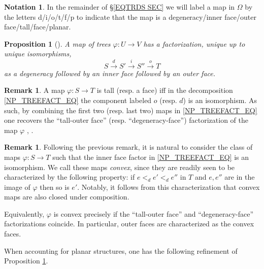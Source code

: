 \documentclass[a4paper,10pt
,draft
]{article}%
\numberwithin{equation}{section}
\numberwithin{figure}{section}
\newtheorem{proposition}[equation]{Proposition}%
\theoremstyle{definition} %
\newtheorem{remark}[equation]{Remark}%
\newtheorem{notation}[equation]{Notation}%
\newcommand{\1}{\ensuremath{\mathbbm 1}}%
\begin{document}
\begin{notation}\label{MAPLABELS_NOT}
	In the remainder of \S \ref{EQTRDS SEC}
      we will label a 
      map in $\Omega$
      by the letters d/i/o/t/f/p
      to indicate that the map is
      a degeneracy/inner face/outer face/tall/face/planar.
\end{notation}


\begin{proposition}[{\cite[Prop. 2.2]{BP_edss}}]
      \label{NP_TREEFACT_PROP}
	A map of trees $\varphi \colon U \to V$ has a factorization, unique up to unique isomorphisms,
        \begin{equation}\label{NP_TREEFACT_EQ}
              S \xrightarrow{d} 
              S' \xrightarrow{i} 
              S'' \xrightarrow{o}
              T
        \end{equation}
        as a degeneracy followed by an inner face followed by an outer face.
\end{proposition}

\begin{remark}\label{TODF REM}
	A map $\varphi \colon S \to T$
	is tall (resp. a face)
	iff in the decomposition \eqref{NP_TREEFACT_EQ}
	the component labeled $o$ (resp. $d$)
	is an isomorphism.
	As such, by combining the 
	first two (resp. last two)
	maps in \eqref{NP_TREEFACT_EQ}
	one recovers the 
	``tall-outer face'' 
	(resp. ``degeneracy-face'')
	factorization of the map $\varphi$
	\cite[Prop. 3.36]{BP_geo}, \cite[Prop. 5.37]{Per18}.
\end{remark}



\begin{remark}\label{CNVXM REM}
	Following the previous remark, 
	it is natural to consider the class of maps
	$\varphi \colon S \to T$
	such that the inner face factor
	in \eqref{NP_TREEFACT_EQ} is an isomorphism.
	We call these maps \textit{convex},
	since they are readily seen to be 
	characterized by the following property:
	if $e <_d e' <_d e''$ in $T$ 
	and $e,e''$ are in the image of $\varphi$
	then so is $e'$.
	Notably, it follows from this characterization that convex maps are also closed under composition.
	
	Equivalently, $\varphi$ is convex precisely if
	the ``tall-outer face'' and ``degeneracy-face''
	factorizations coincide.
	In particular, outer faces are characterized
	as the convex faces.
\end{remark}


When accounting for planar structures,
one has the following refinement of 
Proposition \ref{NP_TREEFACT_PROP}.
\end{document}
